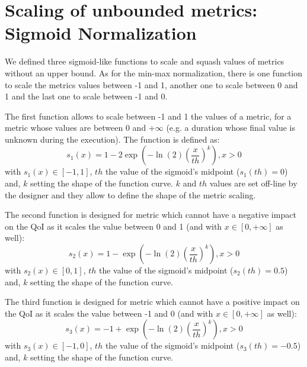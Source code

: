 \section{Scaling of unbounded metrics: Sigmoid Normalization}\label{subsubsec:loga}
We defined three sigmoid-like functions to scale and squash values of metrics without an upper bound. As for the min-max normalization, there is one function to scale the metrics values between -1 and 1, another one to scale between 0 and 1 and the last one to scale between -1 and 0. 

The first function allows to scale between -1 and 1 the values of a metric, for a metric whose values are between 0 and $+\infty$ (e.g. a duration whose final value is unknown during the execution). The function is defined as:
\begin{equation}\label{eq:sig1}
s_1(x) = 1 - 2 \exp{\left(-\ln{(2)}\left(\dfrac{x}{th}\right)^k\right)}, x > 0
\end{equation}
with $s_1(x) \in [-1,1]$, $th$ the value of the sigmoid's midpoint (\ie $s_1(th)=0$) and, $k$ setting the shape of the function curve. $k$ and $th$ values are set off-line by the designer and they allow to define the shape of the metric scaling.

The second function is designed for metric which cannot have a negative impact on the QoI as it scales the value between 0 and 1 (and with $x \in [0,+\infty]$ as well):
\begin{equation}\label{eq:sig2}
s_2(x) = 1 - \exp{\left(-\ln{(2)}\left(\dfrac{x}{th}\right)^k\right)}, x > 0
\end{equation}
with $s_2(x) \in [0,1]$, $th$ the value of the sigmoid's midpoint (\ie $s_2(th)=0.5$) and, $k$ setting the shape of the function curve.

The third function is designed for metric which cannot have a positive impact on the QoI as it scales the value between -1 and 0 (and with $x \in [0,+\infty]$ as well):
\begin{equation}\label{eq:sig3}
s_3(x) = - 1 + \exp{\left(-\ln{(2)}\left(\dfrac{x}{th}\right)^k\right)}, x > 0
\end{equation}
with $s_3(x) \in [-1,0]$, $th$ the value of the sigmoid's midpoint (\ie $s_3(th)=-0.5$) and, $k$ setting the shape of the function curve.


